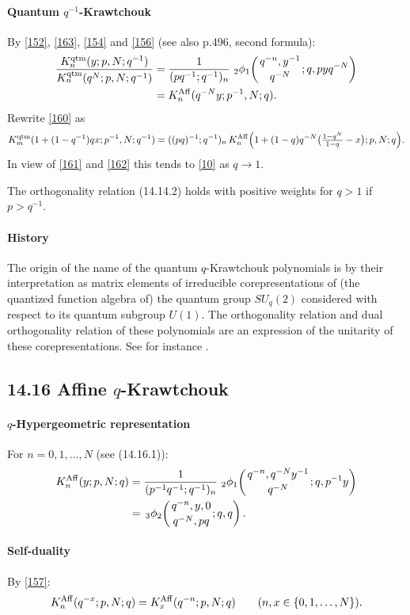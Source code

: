 \documentclass[twoside,11pt]{article}
\newcommand{\qhyp}[5]{\,\mbox{}_{#1}\phi_{#2}\!\left(
  \genfrac{}{}{0pt}{}{#3}{#4};#5\right)}
\begin{document}
\paragraph{Quantum $q^{-1}$-Krawtchouk}
By \eqref{152}, \eqref{163}, \eqref{154} and \eqref{156}
(see also p.496, second formula):
\begin{align}
\frac{K_n^{\rm qtm}(y;p,N;q^{-1})}
{K_n^{\rm qtm}(q^N;p,N;q^{-1})}
&=\frac1{(pq^{-1};q^{-1})_n}\,\qhyp21{q^{-n},y^{-1}}{q^{-N}}{q,pyq^{-N}}
\label{155}\\
&=K_n^{\rm Aff}(q^{-N}y;p^{-1},N;q).
\label{160}
\end{align}
Rewrite \eqref{160} as
\[
K_m^{\rm qtm}(1+(1-q^{-1})qx;p^{-1},N;q^{-1})
=((pq)^{-1};q^{-1})_n\,K_n^{\rm Aff}\Big(1+(1-q)q^{-N}\big(\tfrac{1-q^N}{1-q}-x\big);p,N;q\Big).
\]
In view of \eqref{161} and \eqref{162} this tends to \eqref{10} as $q\to1$.

The orthogonality relation (14.14.2) holds with positive weights for $q>1$
if $p>q^{-1}$.
%
\paragraph{History}
The origin of the name of the quantum $q$-Krawtchouk polynomials
is by their interpretation
as matrix elements of irreducible corepresentations of (the quantized
function algebra of) the quantum group $SU_q(2)$ considered
with respect to its quantum subgroup $U(1)$. The orthogonality
relation and dual orthogonality relation of these polynomials
are an expression of the unitarity of these corepresentations.
See for instance .
%
\subsection*{14.16 Affine $q$-Krawtchouk}
\label{sec14.16}
%
\paragraph{$q$-Hypergeometric representation}
For $n=0,1,\ldots,N$
(see (14.16.1)):
\begin{align}
K_n^{\rm Aff}(y;p,N;q)
&=\frac1{(p^{-1}q^{-1};q^{-1})_n}\,\qhyp21{q^{-n},q^{-N}y^{-1}}{q^{-N}}{q,p^{-1}y}
\label{156}\\
&=\qhyp32{q^{-n},y,0}{q^{-N},pq}{q,q}.
\label{157}
\end{align}
%
\paragraph{Self-duality}
By \eqref{157}:
\begin{equation}
K_n^{\rm Aff}(q^{-x};p,N;q)=K_x^{\rm Aff}(q^{-n};p,N;q)\qquad
(n,x\in\{0,1,\ldots,N\}).
\label{168}
\end{equation}
%
\end{document}
